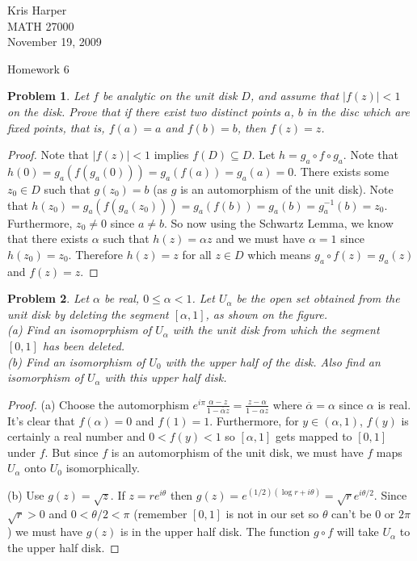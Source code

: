 \documentclass{article}
\newtheorem{problem}{Problem}
\begin{document}
\begin{flushright}
Kris Harper\\

MATH 27000\\

November 19, 2009
\end{flushright}

\begin{center}
Homework 6
\end{center}

\begin{problem}
Let $f$ be analytic on the unit disk $D$, and assume that $|f(z)| < 1$ on the disk. Prove that if there exist two distinct points $a$, $b$ in the disc which are fixed points, that is, $f(a) = a$ and $f(b) = b$, then $f(z) = z$.
\end{problem}
\begin{proof}
Note that $|f(z)| < 1$ implies $f(D) \subseteq D$. Let $h = g_a \circ f \circ g_a$. Note that $h(0) = g_a(f(g_a(0))) = g_a(f(a)) = g_a(a) = 0$. There exists some $z_0 \in D$ such that $g(z_0) = b$ (as $g$ is an automorphism of the unit disk). Note that $h(z_0) = g_a(f(g_a(z_0))) = g_a(f(b)) = g_a(b) = g_a^{-1}(b) = z_0$. Furthermore, $z_0 \neq 0$ since $a \neq b$. So now using the Schwartz Lemma, we know that there exists $\alpha$ such that $h(z) = \alpha z$ and we must have $\alpha = 1$ since $h(z_0) = z_0$. Therefore $h(z) = z$ for all $z \in D$ which means $g_a \circ f (z) = g_a(z)$ and $f(z) = z$.
\end{proof}

\begin{problem}
Let $\alpha$ be real, $0 \leq \alpha < 1$. Let $U_{\alpha}$ be the open set obtained from the unit disk by deleting the segment $[\alpha, 1]$, as shown on the figure.\\
(a) Find an isomoprphism of $U_{\alpha}$ with the unit disk from which the segment $[0,1]$ has been deleted.\\
(b) Find an isomorphism of $U_0$ with the upper half of the disk. Also find an isomorphism of $U_{\alpha}$ with this upper half disk.
\end{problem}
\begin{proof}
(a) Choose the automorphism $e^{i \pi} \frac{\alpha - z}{1 - \overline{\alpha}z} = \frac{z-\alpha}{1-\alpha z}$ where $\overline{\alpha} = \alpha$ since $\alpha$ is real. It's clear that $f(\alpha) = 0$ and $f(1) = 1$. Furthermore, for $y \in (\alpha, 1)$, $f(y)$ is certainly a real number and $0 < f(y) < 1$ so $[\alpha, 1]$ gets mapped to $[0,1]$ under $f$. But since $f$ is an automorphism of the unit disk, we must have $f$ maps $U_{\alpha}$ onto $U_0$ isomorphically.

(b) Use $g(z) = \sqrt{z}$. If $z = re^{i \theta}$ then $g(z) = e^{(1/2)(\log r + i \theta)} = \sqrt{r}e^{i \theta/2}$. Since $\sqrt{r} > 0$ and $0 < \theta/2 < \pi$ (remember $[0,1]$ is not in our set so $\theta$ can't be $0$ or $2 \pi$) we must have $g(z)$ is in the upper half disk. The function $g \circ f$ will take $U_{\alpha}$ to the upper half disk.
\end{proof}
\end{document}

